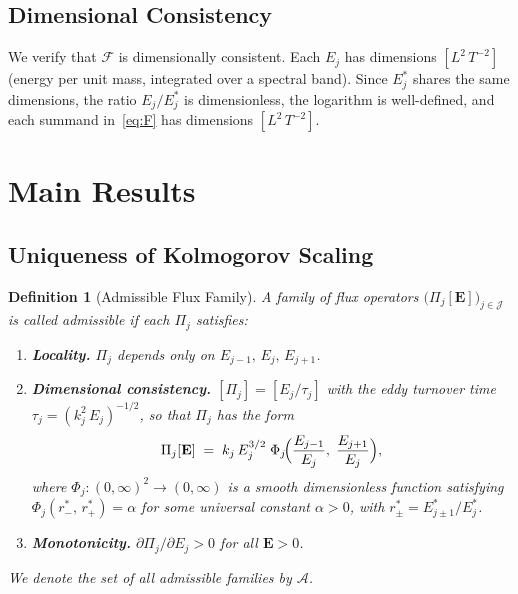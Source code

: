 \documentclass[12pt,a4paper]{article}
\theoremstyle{breakdef}
\newtheorem{definition}{Definition}[section]
\theoremstyle{breakplain}
\theoremstyle{breakdef}
\begin{document}
\subsection{Dimensional Consistency}

We verify that $\mathcal{F}$ is dimensionally consistent.  Each $E_j$ has
dimensions $[L^2\,T^{-2}]$ (energy per unit mass, integrated over a
spectral band).  Since $E_j^*$ shares the same dimensions, the ratio
$E_j/E_j^*$ is dimensionless, the logarithm is well-defined, and each
summand in~\eqref{eq:F} has dimensions $[L^2\,T^{-2}]$.

\section{Main Results}\label{sec:results}

\subsection{Uniqueness of Kolmogorov Scaling}

\begin{definition}[Admissible Flux Family]\label{def:admissible}
A family of flux operators $\bigl(\Pi_j[\mathbf{E}]\bigr)_{j \in
\mathcal{J}}$ is called \emph{admissible} if each $\Pi_j$ satisfies:
\begin{enumerate}
  \item[\textup{(A1)}] \textbf{Locality.}\quad
    $\Pi_j$ depends only on $E_{j-1},\, E_j,\, E_{j+1}$.
  \item[\textup{(A2)}] \textbf{Dimensional consistency.}\quad
    $[\Pi_j] = [E_j / \tau_j]$ with the eddy turnover time
    $\tau_j = (k_j^2\,E_j)^{-1/2}$, so that $\Pi_j$ has the form
    \begin{equation}\label{eq:closure_general}
      \Pi_j[\mathbf{E}]
      \;=\;
      k_j\,E_j^{3/2}\;\Phi_j\!\Bigl(
        \frac{E_{j-1}}{E_j},\;
        \frac{E_{j+1}}{E_j}
      \Bigr),
    \end{equation}
    where $\Phi_j : (0,\infty)^2 \to (0,\infty)$ is a smooth
    dimensionless function satisfying $\Phi_j(r^*_{-},\, r^*_{+}) = \alpha$
    for some universal constant $\alpha > 0$, with
    $r^*_{\pm} = E_{j \pm 1}^* / E_j^*$.
  \item[\textup{(A3)}] \textbf{Monotonicity.}\quad
    $\partial \Pi_j / \partial E_j > 0$ for all $\mathbf{E} > 0$.
\end{enumerate}
We denote the set of all admissible families by $\mathscr{A}$.
\end{definition}
\end{document}
